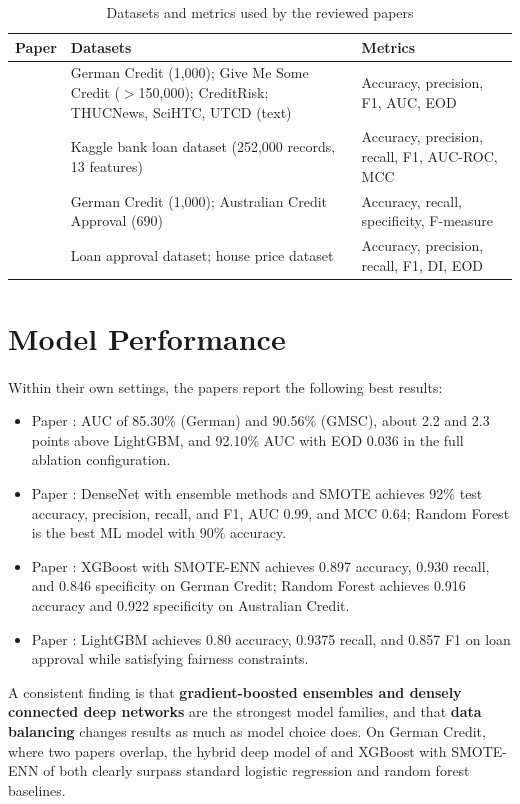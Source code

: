 \documentclass[12pt,a4paper,final]{extreport}
\begin{document}
{\renewcommand{\arraystretch}{1.2}
\begin{table}[htbp]
\centering
\caption{Datasets and metrics used by the reviewed papers}\label{tab:datasets}
\small
\begin{tabularx}{\textwidth}{|p{1.2cm}|X|X|}
\hline
\textbf{Paper} & \textbf{Datasets} & \textbf{Metrics} \\ \hline
\cite{p1} & German Credit (1{,}000); Give Me Some Credit ($>$150{,}000); CreditRisk; THUCNews, SciHTC, UTCD (text) & Accuracy, precision, F1, AUC, EOD \\ \hline
\cite{p2} & Kaggle bank loan dataset (252{,}000 records, 13 features) & Accuracy, precision, recall, F1, AUC-ROC, MCC \\ \hline
\cite{p3} & German Credit (1{,}000); Australian Credit Approval (690) & Accuracy, recall, specificity, F-measure \\ \hline
\cite{p4} & Loan approval dataset; house price dataset & Accuracy, precision, recall, F1, DI, EOD \\ \hline
\end{tabularx}
\end{table}}

\section{Model Performance}

\paragraph{} Within their own settings, the papers report the following best results:
\begin{itemize}
  \item Paper \cite{p1}: AUC of 85.30\% (German) and 90.56\% (GMSC), about 2.2 and 2.3 points above LightGBM, and 92.10\% AUC with EOD 0.036 in the full ablation configuration.
  \item Paper \cite{p2}: DenseNet with ensemble methods and SMOTE achieves 92\% test accuracy, precision, recall, and F1, AUC 0.99, and MCC 0.64; Random Forest is the best ML model with 90\% accuracy.
  \item Paper \cite{p3}: XGBoost with SMOTE-ENN achieves 0.897 accuracy, 0.930 recall, and 0.846 specificity on German Credit; Random Forest achieves 0.916 accuracy and 0.922 specificity on Australian Credit.
  \item Paper \cite{p4}: LightGBM achieves 0.80 accuracy, 0.9375 recall, and 0.857 F1 on loan approval while satisfying fairness constraints.
\end{itemize}
A consistent finding is that \textbf{gradient-boosted ensembles and densely connected deep networks} are the strongest model families, and that \textbf{data balancing} changes results as much as model choice does. On German Credit, where two papers overlap, the hybrid deep model of \cite{p1} and XGBoost with SMOTE-ENN of \cite{p3} both clearly surpass standard logistic regression and random forest baselines.
\end{document}
